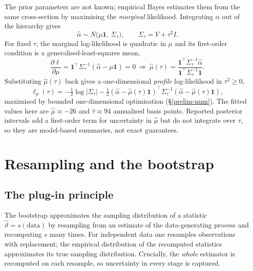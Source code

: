 The prior parameters are not known; empirical Bayes estimates them from
the same cross-section by maximising the \emph{marginal} likelihood.
Integrating $\alpha$ out of the hierarchy gives
\begin{equation}\label{eq:marg}
\hat\alpha\sim N\bigl(\mu\mathbf 1,\ \Sigma_\tau\bigr),
\qquad \Sigma_\tau=V+\tau^2 I .
\end{equation}
For fixed $\tau$, the marginal log-likelihood is quadratic in $\mu$ and its
first-order condition is a generalised-least-squares mean,
\begin{equation}\label{eq:mu-gls}
\frac{\partial\ell}{\partial\mu}=\mathbf 1^{\top}\Sigma_\tau^{-1}(\hat\alpha-\mu\mathbf 1)=0
\ \Longrightarrow\
\hat\mu(\tau)=\frac{\mathbf 1^{\top}\Sigma_\tau^{-1}\hat\alpha}{\mathbf 1^{\top}\Sigma_\tau^{-1}\mathbf 1}.
\end{equation}
Substituting $\hat\mu(\tau)$ back gives a one-dimensional \emph{profile}
log-likelihood in $\tau^2\ge 0$,
\begin{equation}
\ell_p(\tau)=-\tfrac12\log\lvert\Sigma_\tau\rvert
-\tfrac12(\hat\alpha-\hat\mu(\tau)\mathbf 1)^{\top}\Sigma_\tau^{-1}(\hat\alpha-\hat\mu(\tau)\mathbf 1),
\end{equation}
maximised by bounded one-dimensional optimisation (\S\ref{prelim-num}).
The fitted values here are $\hat\mu\approx-26$ and
$\hat\tau\approx 94$ annualised basis points. Reported posterior intervals
add a first-order term for uncertainty in $\hat\mu$ but do not integrate
over $\tau$, so they are model-based summaries, not exact guarantees.

\section{Resampling and the bootstrap}\label{prelim-boot}

\subsection{The plug-in principle}

The bootstrap approximates the sampling distribution of a statistic
$\hat\vartheta=s(\text{data})$ by resampling from an estimate of the
data-generating process and recomputing $s$ many times. For independent
data one resamples observations with replacement; the empirical
distribution of the recomputed statistics approximates its true sampling
distribution. Crucially, the \emph{whole} estimator is recomputed on each
resample, so uncertainty in every stage is captured.


